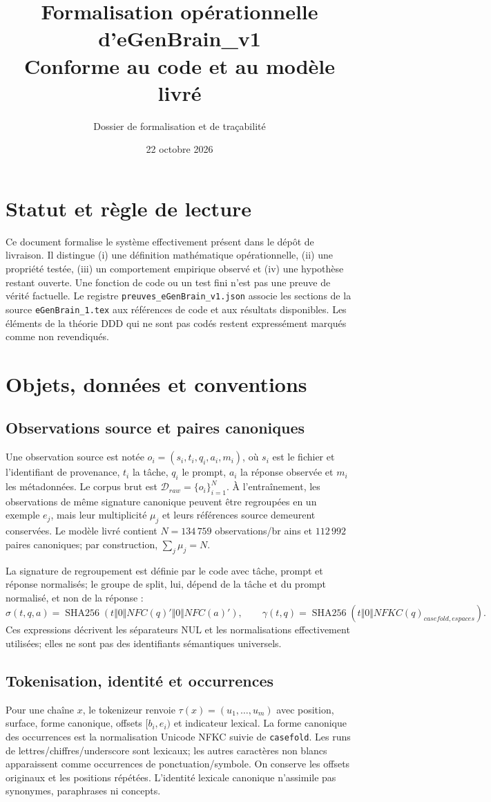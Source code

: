 \documentclass[11pt,a4paper,openany]{book}
\title{Formalisation opérationnelle d'eGenBrain\_v1\\\large Conforme au code et au modèle livré}
\author{Dossier de formalisation et de traçabilité}
\date{22 octobre 2026}
\begin{document}
\maketitle\tableofcontents
\chapter*{Statut et règle de lecture}
Ce document formalise le système effectivement présent dans le dépôt de livraison. Il distingue (i) une définition mathématique opérationnelle, (ii) une propriété testée, (iii) un comportement empirique observé et (iv) une hypothèse restant ouverte. Une fonction de code ou un test fini n'est pas une preuve de vérité factuelle. Le registre \texttt{preuves\_eGenBrain\_v1.json} associe les sections de la source \texttt{eGenBrain\_1.tex} aux références de code et aux résultats disponibles. Les éléments de la théorie DDD qui ne sont pas codés restent expressément marqués comme non revendiqués.

\chapter{Objets, données et conventions}
\section{Observations source et paires canoniques}
Une observation source est notée $o_i=(s_i,t_i,q_i,a_i,m_i)$, où $s_i$ est le fichier et l'identifiant de provenance, $t_i$ la tâche, $q_i$ le prompt, $a_i$ la réponse observée et $m_i$ les métadonnées. Le corpus brut est $\mathcal{D}_{raw}=\{o_i\}_{i=1}^{N}$. À l'entraînement, les observations de même signature canonique peuvent être regroupées en un exemple $e_j$, mais leur multiplicité $\mu_j$ et leurs références source demeurent conservées. Le modèle livré contient $N=134\,759$ observations/br ains et $112\,992$ paires canoniques; par construction, $\sum_j\mu_j=N$.

La signature de regroupement est définie par le code avec tâche, prompt et réponse normalisés; le groupe de split, lui, dépend de la tâche et du prompt normalisé, et non de la réponse :
\[
\sigma(t,q,a)=\operatorname{SHA256}(t\Vert 0\Vert NFC(q)'\Vert 0\Vert NFC(a)'),\qquad
\gamma(t,q)=\operatorname{SHA256}(t\Vert 0\Vert NFKC(q)_{casefold,espaces}).
\]
Ces expressions décrivent les séparateurs NUL et les normalisations effectivement utilisées; elles ne sont pas des identifiants sémantiques universels.

\section{Tokenisation, identité et occurrences}
Pour une chaîne $x$, le tokenizeur renvoie $\tau(x)=(u_1,\ldots,u_m)$ avec position, surface, forme canonique, offsets $[b_i,e_i)$ et indicateur lexical. La forme canonique des occurrences est la normalisation Unicode NFKC suivie de \texttt{casefold}. Les runs de lettres/chiffres/underscore sont lexicaux; les autres caractères non blancs apparaissent comme occurrences de ponctuation/symbole. On conserve les offsets originaux et les positions répétées. L'identité lexicale canonique n'assimile pas synonymes, paraphrases ni concepts.
\end{document}
